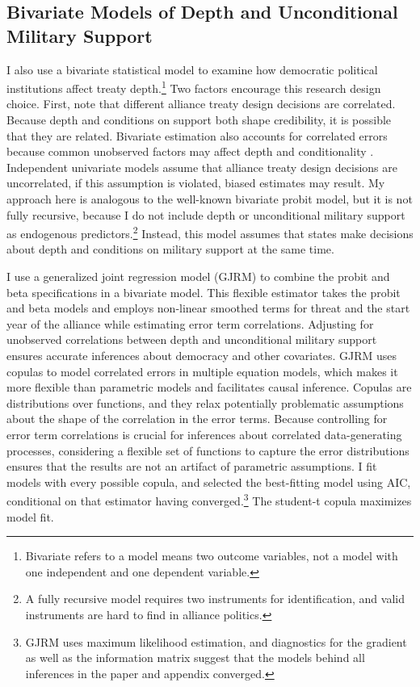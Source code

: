 \documentclass[12pt]{article}
\begin{document}
\subsection{Bivariate Models of Depth and Unconditional Military Support}


I also use a bivariate statistical model to examine how democratic political institutions affect treaty depth.\footnote{Bivariate refers to a model means two outcome variables, not a model with one independent and one dependent variable.} 
Two factors encourage this research design choice. 
First, \citet{FjelstulReiter2019} note that different alliance treaty design decisions are correlated.
Because depth and conditions on support both shape credibility, it is possible that they are related. 
Bivariate estimation also accounts for correlated errors because common unobserved factors may affect depth and conditionality \citep{Braumoelleretal2018}.
Independent univariate models assume that alliance treaty design decisions are uncorrelated, if this assumption is violated, biased estimates may result. 
My approach here is analogous to the well-known bivariate probit model, but it is not fully recursive, because I do not include depth or unconditional military support as endogenous predictors.\footnote{A fully recursive model requires two instruments for identification, and valid instruments are hard to find in alliance politics.}  
Instead, this model assumes that states make decisions about depth and conditions on military support at the same time. 


I use a generalized joint regression model (GJRM) \citep{Braumoelleretal2018} to combine the probit and beta specifications in a bivariate model.
This flexible estimator takes the probit and beta models and employs non-linear smoothed terms for threat and the start year of the alliance while estimating error term correlations. 
Adjusting for unobserved correlations between depth and unconditional military support ensures accurate inferences about democracy and other covariates.
GJRM uses copulas to model correlated errors in multiple equation models, which makes it more flexible than parametric models and facilitates causal inference. 
Copulas are distributions over functions, and they relax potentially problematic assumptions about the shape of the correlation in the error terms. 
Because controlling for error term correlations is crucial for inferences about correlated data-generating processes, considering a flexible set of functions to capture the error distributions ensures that the results are not an artifact of parametric assumptions. 
I fit models with every possible copula, and selected the best-fitting model using AIC, conditional on that estimator having converged.\footnote{GJRM uses maximum likelihood estimation, and diagnostics for the gradient as well as the information matrix suggest that the models behind all inferences in the paper and appendix converged.} 
The student-t copula maximizes model fit. 
\end{document}
